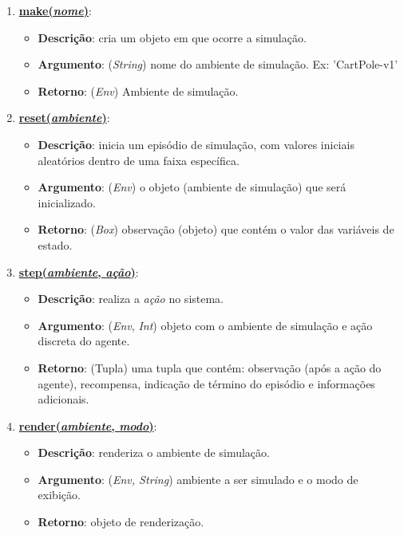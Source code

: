 \begin{enumerate}[label=\alph*)]
\item \textbf{\underline{make(\textit{nome})}}:
\begin{itemize}[label=\raisebox{0.25ex}{\tiny$\bullet$}]
\item \textbf{Descrição}: cria um objeto em que ocorre a simulação.
\item \textbf{Argumento}: (\textit{String}) nome do ambiente de simulação. Ex: 'CartPole-v1'
\item \textbf{Retorno}: (\textit{Env}) Ambiente de simulação.
\end{itemize}
\item \textbf{\underline{reset(\textit{ambiente})}}:
\begin{itemize}[label=\raisebox{0.25ex}{\tiny$\bullet$}]
\item \textbf{Descrição}: inicia um episódio de simulação, com valores iniciais aleatórios dentro de uma faixa específica.
\item \textbf{Argumento}: (\textit{Env}) o objeto (ambiente de simulação) que será inicializado.
\item \textbf{Retorno}: (\textit{Box}) observação (objeto) que contém o valor das variáveis de estado.
\end{itemize}
\item \textbf{\underline{step(\textit{ambiente}, \textit{ação})}}:
\begin{itemize}[label=\raisebox{0.25ex}{\tiny$\bullet$}]
\item \textbf{Descrição}: realiza a \textit{ação} no sistema.
\item \textbf{Argumento}: (\textit{Env}, \textit{Int}) objeto com o ambiente de simulação e ação discreta do agente.
\item \textbf{Retorno}: (Tupla) uma tupla que contém: observação (após a ação do agente), recompensa, indicação de término do episódio e informações adicionais.
\end{itemize}
\item \textbf{\underline{render(\textit{ambiente}, \textit{modo})}}:
\begin{itemize}[label=\raisebox{0.25ex}{\tiny$\bullet$}]
\item \textbf{Descrição}: renderiza o ambiente de simulação.
\item \textbf{Argumento}: (\textit{Env, String}) ambiente a ser simulado e o modo de exibição.
\item \textbf{Retorno}: objeto de renderização.
\end{itemize}
\end{enumerate}

